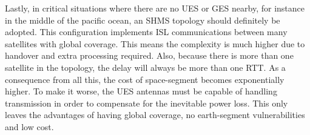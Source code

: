 Lastly, in critical situations where there are no UES or GES nearby, for instance in the middle of the pacific ocean, an SHMS topology should definitely be adopted. This configuration implements ISL communications between many satellites with global coverage. This means the complexity is much higher due to handover and extra processing required. Also, because there is more than one satellite in the topology, the delay will always be more than one RTT. As a consequence from all this, the cost of space-segment becomes exponentially higher. To make it worse, the UES antennas must be capable of handling transmission in order to compensate for the inevitable power loss. This only leaves the advantages of having global coverage, no earth-segment vulnerabilities and low cost.